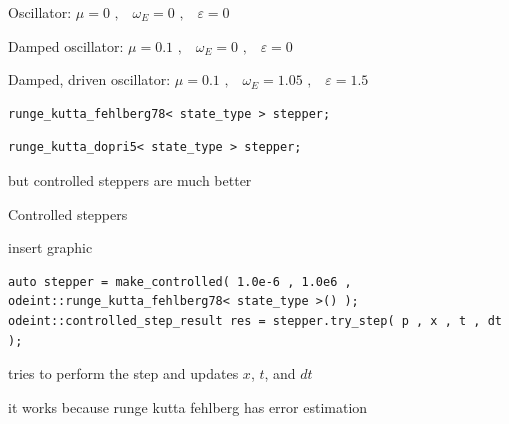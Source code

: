 \begin{frame}[fragile]

 \vspace{4ex}

 \centerline{Oscillator: $\mu=0 \,\, \text{,} \quad \omega_E = 0 \,\, \text{,} \quad \varepsilon=0$}

 \vspace{2ex}
 
\centerline{Damped oscillator: $\mu=0.1 \,\, \text{,} \quad \omega_E = 0 \,\, \text{,} \quad \varepsilon=0$}

 \vspace{2ex}

 \centerline{Damped, driven oscillator: $\mu=0.1 \,\, \text{,} \quad \omega_E = 1.05 \,\, \text{,} \quad \varepsilon=1.5$}
\end{frame}

\begin{frame}[fragile]


  \vspace{2ex}

  \begin{lstlisting}
runge_kutta_fehlberg78< state_type > stepper;
  \end{lstlisting}

  \begin{lstlisting}
runge_kutta_dopri5< state_type > stepper;
  \end{lstlisting}

  but controlled steppers are much better

\end{frame}


\begin{frame}[fragile]
 Controlled steppers

 insert graphic

 \begin{lstlisting}
auto stepper = make_controlled( 1.0e-6 , 1.0e6 ,  odeint::runge_kutta_fehlberg78< state_type >() );
odeint::controlled_step_result res = stepper.try_step( p , x , t , dt );
 \end{lstlisting}

 tries to perform the step and updates $x$, $t$, and $dt$

 it works because runge kutta fehlberg has error estimation

\end{frame}


